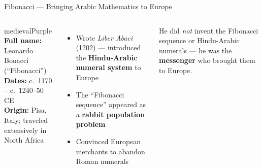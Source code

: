\begin{frame}[shrink=25]{Fibonacci --- Bringing Arabic Mathematics to Europe}
  \begin{columns}[T]
    \begin{personbox}{medievalPurple}
      \textbf{Full name:} Leonardo Bonacci (``Fibonacci'')\\[3pt]
      \textbf{Dates:} c.\ 1170 -- c.\ 1240--50 CE\\
      \textbf{Origin:} Pisa, Italy; traveled extensively in North Africa
    \end{personbox}
    \vspace{0.3em}
    \begin{itemize}
      \item Wrote \textit{Liber Abaci} (1202) --- introduced the \textbf{Hindu-Arabic numeral system} to Europe
      \item The ``Fibonacci sequence'' appeared as a \textbf{rabbit population problem}
      \item Convinced European merchants to abandon Roman numerals
    \end{itemize}

    \vspace{0.3em}
    \begin{insightbox}
      {\footnotesize He did \emph{not} invent the Fibonacci sequence or Hindu-Arabic numerals --- he was the \textbf{messenger} who brought them to Europe.}
    \end{insightbox}


    \vspace{0.3em}
  \end{columns}

\end{frame}

